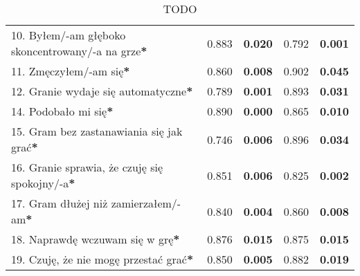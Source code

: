 \begin{table}[h!]
\begin{center}
\begin{tabular}{|m{10em}|m{5em}|m{5em}|m{5em}|m{5em}|}
            10. Byłem/-am głęboko \newline skoncentrowany/-a \newline na grze\textbf{*} & 0.883                       & \textbf{0.020}   & 0.792                   & \textbf{0.001} \\
            11. Zmęczyłem/-am się\textbf{*}                                             & 0.860                       & \textbf{0.008}   & 0.902                   & \textbf{0.045} \\
            12. Granie wydaje się automatyczne\textbf{*}                                & 0.789                       & \textbf{0.001}   & 0.893                   & \textbf{0.031} \\
            14. Podobało mi się\textbf{*}                                               & 0.890                       & \textbf{0.000}   & 0.865                   & \textbf{0.010} \\
            15. Gram bez zastanawiania się jak grać\textbf{*}                           & 0.746                       & \textbf{0.006}   & 0.896                   & \textbf{0.034} \\
            16. Granie sprawia, \newline że czuję się spokojny/-a\textbf{*}             & 0.851                       & \textbf{0.006}   & 0.825                   & \textbf{0.002} \\
            17. Gram dłużej \newline niż zamierzałem/-am\textbf{*}                      & 0.840                       & \textbf{0.004}   & 0.860                   & \textbf{0.008} \\
            18. Naprawdę wczuwam się w grę\textbf{*}                                    & 0.876                       & \textbf{0.015}   & 0.875                   & \textbf{0.015} \\
            19. Czuję, że nie mogę przestać grać\textbf{*}                              & 0.850                       & \textbf{0.005}   & 0.882                   & \textbf{0.019} \\
            \hline
        \end{tabular}
    \end{center}
    \caption{TODO}\label{tab1:ch7_11}
\end{table}

